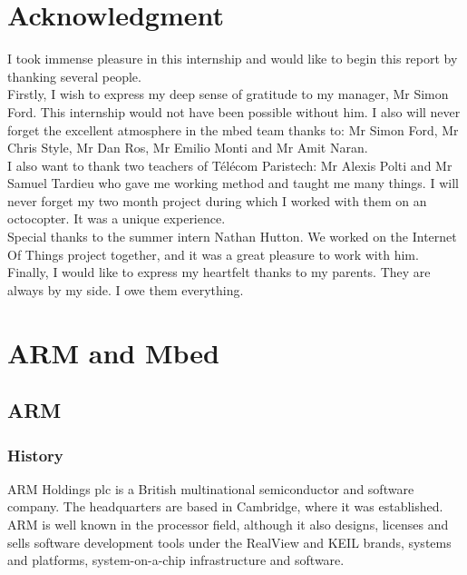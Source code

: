 \documentclass[pdftex,10pt,a4paper]{report}
\begin{document}



\chapter*{Acknowledgment}
I took immense pleasure in this internship and would like to begin this report by thanking several people. \\

Firstly, I wish to express my deep sense of gratitude to my manager, Mr Simon Ford. This internship would not have been possible without him. I also will never forget the excellent atmosphere in the mbed team thanks to: Mr Simon Ford, Mr Chris Style, Mr Dan Ros, Mr Emilio Monti and Mr Amit Naran. \\

I also want to thank two teachers of T\'{e}l\'{e}com Paristech: Mr Alexis Polti and Mr Samuel Tardieu who gave me working method and taught me many things. I will never forget my two month project during which I worked with them on an octocopter. It was a unique experience. \\

Special thanks to the summer intern Nathan Hutton. We worked on the Internet Of Things project together, and it was a great pleasure to work with him. \\

Finally, I would like to express my heartfelt thanks to my parents. They are always by my side. I owe them everything. 

\tableofcontents

\chapter{ARM and Mbed}
\section{ARM}
\subsection{History}
ARM Holdings plc is a British multinational semiconductor and software company. The headquarters are based in Cambridge, where it was established. ARM is well known in the processor field, although it also designs, licenses and sells software development tools under the RealView and KEIL brands, systems and platforms, system-on-a-chip infrastructure and software. 
\\
\end{document}
